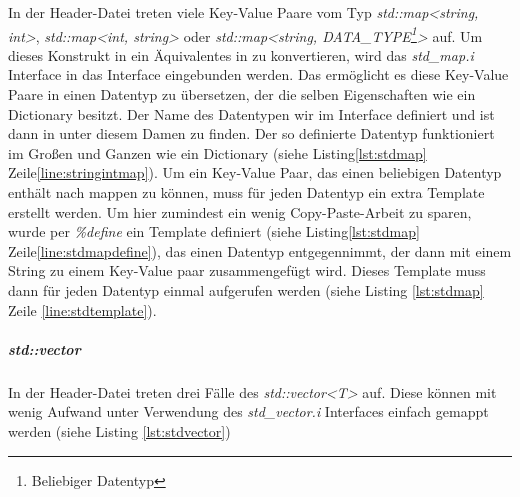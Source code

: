 In der Header-Datei treten viele Key-Value Paare vom Typ \emph{std::map<string, int>}, \emph{std::map<int, string>} oder \emph{std::map<string, DATA\_TYPE\footnote{Beliebiger Datentyp}>} auf. Um dieses Konstrukt in ein Äquivalentes in \CS zu konvertieren, wird das \emph{std\_map.i} Interface in das Interface eingebunden werden. Das ermöglicht es diese Key-Value Paare in einen Datentyp zu übersetzen, der die selben Eigenschaften  wie ein \CS Dictionary besitzt.  Der Name des Datentypen wir im Interface definiert und ist dann in \CS unter diesem Damen zu finden. Der so definierte Datentyp funktioniert im Großen und Ganzen wie ein Dictionary (siehe Listing\ref{lst:stdmap} Zeile\ref{line:stringintmap}). Um ein Key-Value Paar, das einen beliebigen Datentyp enthält nach \CS mappen zu können, muss für jeden Datentyp ein extra Template erstellt werden. Um hier zumindest ein wenig Copy-Paste-Arbeit zu sparen, wurde per \emph{\%define} ein Template definiert (siehe Listing\ref{lst:stdmap} Zeile\ref{line:stdmapdefine}), das einen Datentyp entgegennimmt, der dann mit einem String zu einem Key-Value paar zusammengefügt wird. Dieses Template muss dann für jeden Datentyp einmal aufgerufen werden (siehe Listing \ref{lst:stdmap} Zeile \ref{line:stdtemplate}). 

\begin{code}[caption={std::map},label={lst:stdmap}, escapechar=|]

	

\end{code}

\subparagraph{std::vector}

In der Header-Datei treten drei Fälle des \emph{std::vector<T>} auf. Diese können mit wenig Aufwand unter Verwendung des \emph{std\_vector.i} Interfaces einfach gemappt werden (siehe Listing \ref{lst:stdvector})

\begin{code}[caption={std::vector},label={lst:stdvector}, escapechar=|]

\end{code}

